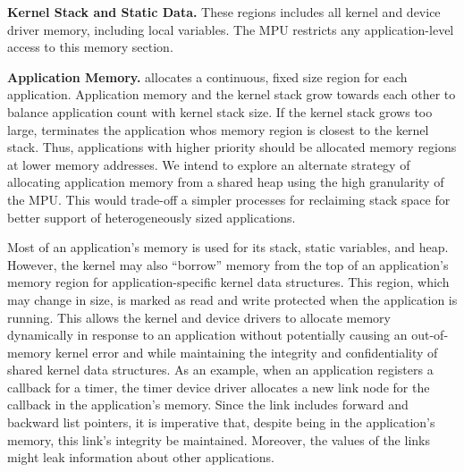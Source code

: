 {\bf Kernel Stack and Static Data.}
These regions includes all kernel and device driver memory, including local
variables. The MPU restricts any application-level access to this memory
section.

{\bf Application Memory.}
\name allocates a continuous, fixed size region for each application.
Application memory and the kernel stack grow towards each other to balance
application count with kernel stack size. If the kernel stack grows too large,
\name terminates the application whos memory region is closest to the kernel
stack. Thus, applications with higher priority should be allocated memory
regions at lower memory addresses. We intend to explore an alternate strategy of
allocating application memory from a shared heap using the high granularity of
the MPU.  This would trade-off a simpler processes for reclaiming stack space
for better support of heterogeneously sized applications.


Most of an
application's memory is
used for its stack, static variables, and heap. However,
the kernel may also ``borrow'' memory from the top of an application's memory
region for application-specific kernel data structures. This region, which may
change in size,
is marked
as read and write protected when the application is running. This allows the
kernel and device drivers to allocate memory dynamically in response to an
application without
potentially causing an out-of-memory kernel error and while
maintaining the integrity and
confidentiality of shared kernel data structures. As an example, when an
application registers a callback for a timer, the timer device driver
allocates a new link node for the callback in the application's memory.
Since the link includes forward and backward list
pointers, it is imperative that, despite being in the application's memory,
this link's integrity be maintained. Moreover, the values of the links might
leak information about other applications.

